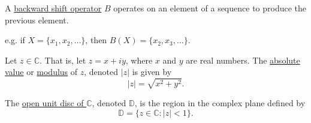 \begin{defn}
A \underline{backward shift operator} $B$ operates on an element of a sequence to produce the previous element.

e.g. if $X = \{x_1, x_2, \dots\}$, then
$B(X) = \{x_2, x_3, \dots\}$.
\end{defn}

\begin{defn}
Let $z \in \mathbb{C}$.  That is, let $z = x + iy$, where $x$ and $y$ are real numbers.  The \underline{absolute value} or \underline{modulus} of $z$, denoted $|z|$ is given by \[|z| = \sqrt{x^2 + y^2}.\]
\end{defn}

\begin{defn}
The \underline{open unit disc of $\mathbb{C}$}, denoted $\mathbb{D}$, is the region in the complex plane defined by \[\mathbb{D} = \{z \in \mathbb{C} : |z| < 1\}.\]
\end{defn}

\begin{defn}

\end{defn}